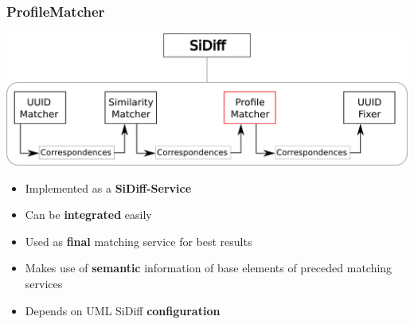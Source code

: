 \documentclass[10pt]{beamer}
\begin{document}
\begin{frame}
\frametitle{ProfileMatcher}
\begin{center}
\includegraphics[scale=0.4]{profilematcher}\\
\end{center}
\begin{itemize}
  \item Implemented as a \textbf{SiDiff-Service}
  \item Can be \textbf{integrated} easily
  \item Used as \textbf{final} matching service for best results
  \item Makes use of \textbf{semantic} information of base elements of
  preceded matching services
  \item Depends on UML SiDiff \textbf{configuration}
\end{itemize}
\end{frame}
\end{document}
